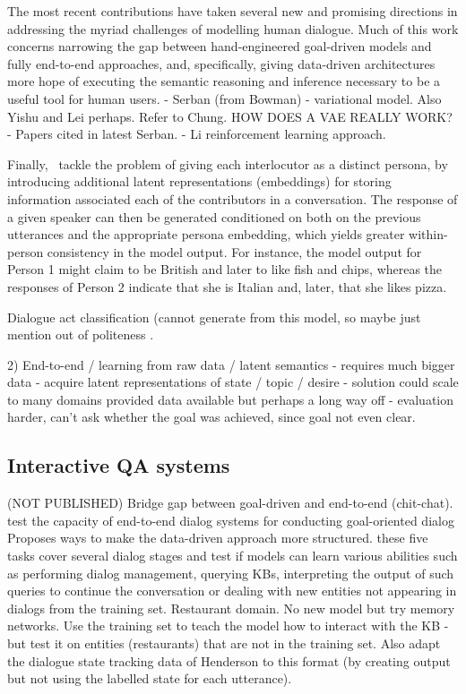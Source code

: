 \documentclass[11pt,letterpaper]{article}
\begin{document}
The most recent contributions have taken several new and promising directions in addressing the myriad challenges of modelling human dialogue. Much of this work concerns narrowing the gap between hand-engineered goal-driven models and fully end-to-end approaches, and, specifically, giving data-driven architectures more hope of executing the semantic reasoning and inference necessary to be a useful tool for human users.  
- Serban (from Bowman) - variational model. Also Yishu and Lei perhaps. Refer to Chung. HOW DOES A VAE REALLY WORK?
- Papers cited in latest Serban. 
- Li reinforcement learning approach.

Finally,~\cite{li2016persona} tackle the problem of giving each interlocutor as a distinct persona, by introducing additional latent representations (embeddings) for storing information associated each of the contributors in a conversation. The response of a given speaker can then be generated conditioned on both on the previous utterances and the appropriate persona embedding, which yields greater within-person consistency in the model output. For instance, the model output for Person 1 might claim to be British and later to like fish and chips, whereas the responses of Person 2 indicate that she is Italian and, later, that she likes pizza. 

\cite{kalchbrenner2013recurrent} Dialogue act classification (cannot generate from this model, so maybe just mention out of politeness . 

2) End-to-end / learning from raw data / latent semantics
- requires much bigger data
- acquire latent representations of state / topic / desire
- solution could scale to many domains provided data available but perhaps a long way off
- evaluation harder, can't ask whether the goal was achieved, since goal not even clear. 

\subsection{Interactive QA systems}



\cite{weston2016dialog}

\cite{bordes2016learning} (NOT PUBLISHED) Bridge gap between goal-driven and end-to-end (chit-chat). test the capacity of end-to-end dialog systems for conducting goal-oriented
dialog Proposes ways to make the data-driven approach more structured. these five tasks cover several dialog stages and test if models can learn various abilities such as
performing dialog management, querying KBs, interpreting the output of such queries to continue
the conversation or dealing with new entities not appearing in dialogs from the training set. Restaurant domain. No new model but try memory networks. Use the training set to teach the model how to interact with the KB - but test it on entities (restaurants) that are not in the training set. Also adapt the dialogue state tracking data of Henderson to this format (by creating output but not using the labelled state for each utterance). 
\end{document}
